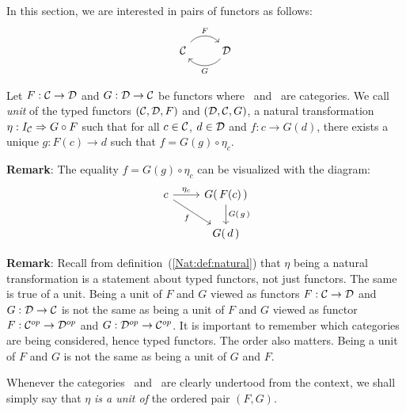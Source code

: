 In this section, we are interested in pairs of functors as follows:
    \[
        \begin{tikzcd}
              \Cat \arrow[r, "F", bend left  = 50, ""{name=U, below}]
            & \Dat \arrow[l, "G", bend left = 50, ""{name=D, above}]
        \end{tikzcd}
    \]

\begin{defin}\label{Adj:def:unit}
    Let $F:\mbox{$\cal C$}\to\mbox{$\cal D$}$ and $G:\mbox{$\cal D$}\to\mbox{$\cal C$}$ be functors where \Cat\ and \Dat\ 
    are categories. We call {\em unit} of the typed functors $(\mbox{$\cal C$},\mbox{$\cal D$},F)$
    and $(\mbox{$\cal D$},\mbox{$\cal C$},G)$, a natural transformation 
    $\eta:I_{\cal C}\Rightarrow G\circ F$ such that for all 
    $c\in\mbox{$\cal C$}$, $d\in\mbox{$\cal D$}$ and $f:c\to G(d)$, there exists a
    unique $g:F(c) \to d$ such that $f = G(g) \circ \eta_{c}$.
\end{defin}

\noindent
{\bf Remark}: The equality $f = G(g) \circ \eta_{c}$ can be visualized with
the diagram:
    \[
        \begin{tikzcd}
            c \arrow[rd,swap, "f"]\arrow[r,"\eta_{c}"] 
            &G(\,F(c)\,)\arrow[d,"G(\,g\,)"]\\
            & G(\,d\,)
        \end{tikzcd}
    \]

\noindent
{\bf Remark}: Recall from definition~(\ref{Nat:def:natural}) that $\eta$ being
a natural transformation is a statement about typed functors, not just functors. 
The same is true of a unit. Being a unit of $F$ and $G$ viewed as functors 
$F:\mbox{$\cal C$}\to\mbox{$\cal D$}$ and $G:\mbox{$\cal D$}\to\mbox{$\cal C$}$ is not the same as being a unit of $F$ 
and $G$ viewed as functor $F:\mbox{${\cal C}^{op}$}\to\mbox{${\cal D}^{op}$}$ and $G:\mbox{${\cal D}^{op}$}\to\mbox{${\cal C}^{op}$}$. It is important
to remember which categories are being considered, hence typed functors. The
order also matters. Being a unit of $F$ and $G$ is not the same as being a unit
of $G$ and $F$.

\begin{notation}\label{Adj:notation:unit}
    Whenever the categories \Cat\ and \Dat\ are clearly undertood from the 
    context, we shall simply say that $\eta$ {\em is a unit of} the
    ordered pair $(F,G)$.
\end{notation}

